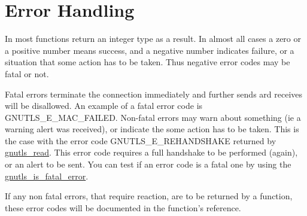 \section{Error Handling}
\par
In \gnutls most functions return an integer type as a result.
In almost all cases a zero or a positive number means success, and
a negative number indicates failure, or a situation that some
action has to be taken. Thus negative error codes may be fatal
or not. 
\par 
Fatal errors terminate the connection immediately and
further sends ard receives will be disallowed. An example of
a fatal error code is GNUTLS\_E\_MAC\_FAILED. Non-fatal errors
may warn about something (ie a warning alert was received), or
indicate the some action has to be taken. This is the case with
the error code GNUTLS\_E\_REHANDSHAKE returned by 
\hyperref{gnutls\_read()}{gnutls\_read() (see Section }{
for more information)}{gnutls_read}.
This error code requires a full handshake to be performed (again), or an alert to be sent.
You can test if an error code is a fatal one by using the
\hyperref{gnutls\_is\_fatal\_error()}{gnutls\_is\_fatal\_error() (see Section }{
for more information)}{gnutls_is_fatal_error}.
\par
If any non fatal errors, that require reaction, are to be returned by a
function, these error codes will be documented
in the function's reference.

